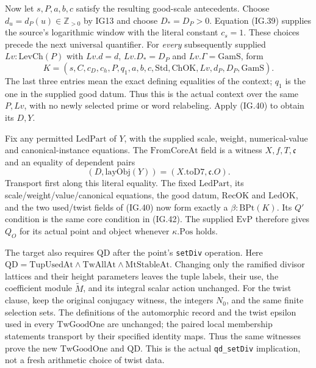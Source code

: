 Now let $s,P,a,b,c$ satisfy the resulting good-scale antecedents.
Choose $d_u=d_P(u)\in\mathbb Z_{>0}$ by IG13 and choose
$D_*=D_P>0$. Equation (IG.39) supplies the source's logarithmic
window with the literal constant $c_s=1$.
These choices precede the next universal quantifier.
For \emph{every} subsequently supplied
$Lv:\mathrm{LevCh}(P)$ with
$Lv.d=d$, $Lv.D_*=D_P$ and $Lv.\Gamma=\mathrm{GamS}$, form
\[
 K=(s,C,c_D,c_h,P,q_1,a,b,c,\mathrm{Std},\mathrm{ChOK},
                                        Lv,d_P,D_P,\mathrm{GamS}).
                                                               \tag{IG.41}
\]
The last three entries mean the exact defining equalities of
the context; $q_1$ is the one in the supplied good datum.
Thus this is the actual context over the same $P,Lv$, with
no newly selected prime or word relabeling. Apply (IG.40)
to obtain its $D,Y$.

Fix any permitted $\mathrm{LedPart}$ of $Y$, with the supplied
scale, weight, numerical-value and canonical-instance equations.
The $\mathrm{FromCoreAt}$ field is a witness $X,f,T,\mathfrak c$
and an equality of dependent pairs
\[
             (D,\mathrm{layObj}(Y))
                     =(X.\mathrm{toD7},\mathfrak c.O).
                                                               \tag{IG.42}
\]
Transport first along this literal equality. The fixed
$\mathrm{LedPart}$, its scale/weight/value/canonical equations,
the good datum, $\mathrm{RecOK}$ and $\mathrm{LedOK}$, and the
two used/twist fields of (IG.40) now form exactly a
$\beta:\mathrm{BPt}(K)$. Its $Q'$ condition is the same core
condition in (IG.42). The supplied $\mathrm{EvP}$ therefore
gives $Q_O$ for its actual point and object whenever
$\kappa.\mathrm{Pos}$ holds.

The target also requires $\mathrm{QD}$ after the point's
\texttt{setDiv} operation. Here
$\mathrm{QD}=\mathrm{TupUsedAt}\wedge\mathrm{TwAllAt}
\wedge\mathrm{MtStableAt}$. Changing only the ramified
divisor lattices and their height parameters leaves the
tuple labels, their use, the coefficient module
$\widetilde M$, and its integral scalar action unchanged.
For the twist clause, keep the original conjugacy witness,
the integers $N_0$, and the same finite selection sets.
The definitions of the automorphic record and the twist
epsilon used in every $\mathrm{TwGoodOne}$ are unchanged;
the paired local membership statements transport by their
specified identity maps. Thus the same witnesses prove
the new $\mathrm{TwGoodOne}$ and $\mathrm{QD}$.
This is the actual \texttt{qd\_setDiv} implication, not a
fresh arithmetic choice of twist data.


